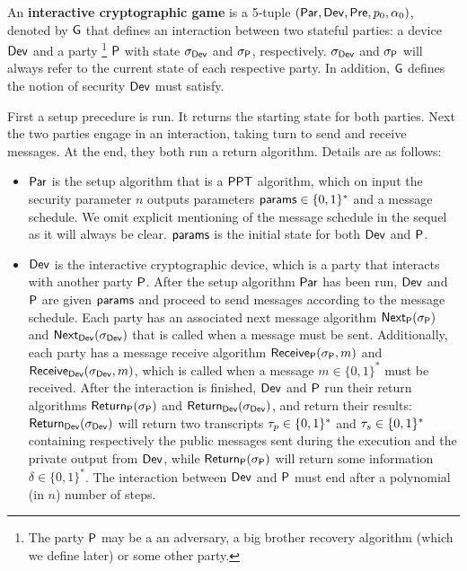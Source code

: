 \begin{defn}
		An \textbf{interactive cryptographic game} is a 5-tuple $(\operatorname{\mathsf{Par}},\operatorname{\mathsf{Dev}}, \operatorname{\mathsf{Pre}}, p_{0}, \alpha_{0})$, denoted by $\operatorname{\mathsf{G}}$ that defines an interaction between two stateful parties: a device $\operatorname{\mathsf{Dev}}$ and a party \footnote{The party $\mathsf{P}$ may be a an adversary, a big brother recovery algorithm (which we define later) or some other party.} $\mathsf{P}$ with state $\sigma_{\operatorname{\mathsf{Dev}}}$ and $\sigma_{\mathsf{P}}$, respectively. $\sigma_{\operatorname{\mathsf{Dev}}}$ and $\sigma_{\mathsf{P}}$ will always refer to the current state of each respective party. In addition, $\operatorname{\mathsf{G}}$ defines the notion of security $\operatorname{\mathsf{Dev}}$ must satisfy. 
		
		First a setup precedure is run. It returns the starting state for both parties. Next the two parties engage in an interaction, taking turn to send and receive messages. At the end, they both run a return algorithm. Details are as follows:
	\begin{itemize}
	\itemsep-0.1em
		\item $\operatorname{\mathsf{Par}}$ is the setup algorithm that is a $\mathsf{PPT}$ algorithm, which on input the security parameter $n$ outputs parameters $\mathsf{params}\in\{0,1\}^*$ and a message schedule. We omit explicit mentioning of the message schedule in the sequel as it will always be clear. $\mathsf{params}$ is the initial state for both $\operatorname{\mathsf{Dev}}$ and $\mathsf{P}$.
		\item $\operatorname{\mathsf{Dev}}$ is the interactive cryptographic device, which is a party that interacts with another party $\mathsf{P}$. After the setup algorithm $\operatorname{\mathsf{Par}}$ has been run, $\operatorname{\mathsf{Dev}}$ and $\mathsf{P}$ are given $\mathsf{params}$ and proceed to send messages according to the message schedule. Each party has an associated next message algorithm $\operatorname{\mathsf{Next}}_{\mathsf{P}}(\sigma_{\mathsf{P}})$ and $\operatorname{\mathsf{Next}}_{\operatorname{\mathsf{Dev}}}(\sigma_{\operatorname{\mathsf{Dev}}})$ that is called when a message must be sent. Additionally, each party has a message receive algorithm $\operatorname{\mathsf{Receive}}_{\mathsf{P}}(\sigma_{\mathsf{P}},m)$ and $\operatorname{\mathsf{Receive}}_{\operatorname{\mathsf{Dev}}}(\sigma_{\operatorname{\mathsf{Dev}}},m)$, which is called when a message $m\in\{0,1\}^*$ must be received. After the interaction is finished, $\operatorname{\mathsf{Dev}}$ and $\mathsf{P}$ run their return algorithms $\operatorname{\mathsf{Return}}_{\mathsf{P}}(\sigma_{\mathsf{P}})$ and $\operatorname{\mathsf{Return}}_{\operatorname{\mathsf{Dev}}}(\sigma_{\operatorname{\mathsf{Dev}}})$, and return their results: $\operatorname{\mathsf{Return}}_{\operatorname{\mathsf{Dev}}}(\sigma_{\operatorname{\mathsf{Dev}}})$ will return two transcripts $\tau_p\in\{0,1\}^*$ and $\tau_s\in\{0,1\}^*$ containing respectively the public messages sent during the execution and the private output from $\operatorname{\mathsf{Dev}}$, while $\operatorname{\mathsf{Return}}_{\mathsf{P}}(\sigma_{\mathsf{P}})$ will return some information $\delta\in\{0,1\}^*$. The interaction between $\operatorname{\mathsf{Dev}}$ and $\mathsf{P}$ must end after a polynomial (in $n$) number of steps.

\end{itemize}
\end{defn}
